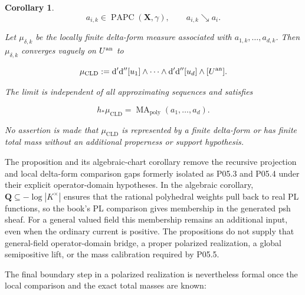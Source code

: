 \documentclass[11pt,a4paper]{article}
\newtheorem{corollary}[corollary]{Corollary}
\theoremstyle{definition}
\theoremstyle{remark}
\newcommand{\rd}{\mathrm d}
\newcommand{\dprime}{\rd'}
\newcommand{\ddprime}{\rd''}
\newcommand{\dprimeddprime}{\dprime\ddprime}
\DeclareMathOperator{\MA}{MA}
\begin{document}
\begin{corollary}
\[
 a_{i,k}\in\operatorname{PAPC}(\mathbf X,\gamma),
 \qquad a_{i,k}\searrow a_i.
\]

Let \(\mu_{\delta,k}\) be the locally finite delta-form measure associated
with \(a_{1,k},\ldots,a_{d,k}\).  Then \(\mu_{\delta,k}\) converges vaguely
on \(U^{\mathrm{an}}\) to

\begin{equation}
 \mu_{\mathrm{CLD}}
 :=\dprimeddprime[u_1]\wedge\cdots\wedge
   \dprimeddprime[u_d]\wedge[U^{\an}].
 \label{eq:p054-repaired-source-limit}
\end{equation}

The limit is independent of all approximating sequences and satisfies

\begin{equation}
 h_*\mu_{\mathrm{CLD}}
 =\MA_{\mathrm{poly}}(a_1,\ldots,a_d).
 \label{eq:p054-repaired-limit-pushforward}
\end{equation}

No assertion is made that \(\mu_{\mathrm{CLD}}\) is represented by a finite
delta-form or has finite total mass without an additional properness or
support hypothesis.
\end{corollary}






The proposition and its algebraic-chart corollary remove the recursive
projection and local delta-form comparison gaps formerly isolated as
P05.3 and P05.4 under their explicit operator-domain hypotheses.  In the
algebraic corollary, \(\mathbf Q\subseteq-\log|K^\times|\) ensures that
the rational polyhedral weights pull back to real PL functions, so the
book's PL comparison gives membership in the generated psh sheaf.  For
a general valued field this membership remains an additional input,
even when the ordinary current is positive.  The propositions do not
supply that general-field operator-domain bridge, a proper polarized
realization, a global semipositive lift, or the mass calibration required
by P05.5.

The final boundary step in a polarized realization is nevertheless formal
once the local comparison and the exact total masses are known:
\end{document}
